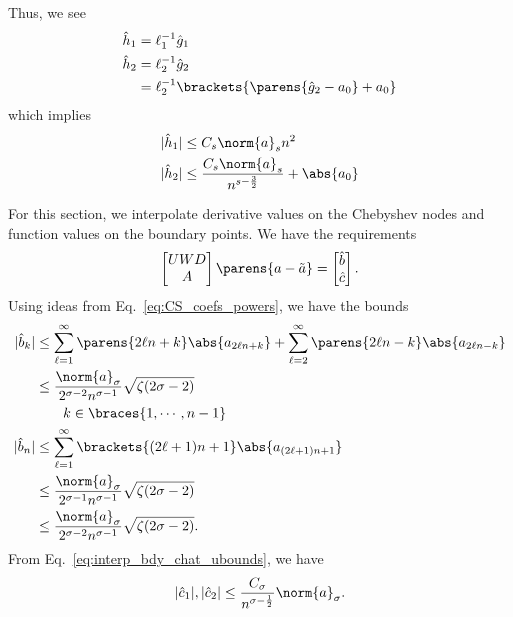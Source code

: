 Thus, we see
%
\begin{align}
    \hat{h}_{1} &= \ell_{1}^{-1}\hat{g}_{1} \nonumber\\
    \hat{h}_{2} &= \ell_{2}^{-1}\hat{g}_{2} \nonumber\\
        &= \ell_{2}^{-1}\brackets{\parens{\hat{g}_{2} - a_{0}} + a_{0}}
\end{align}
%
which implies
%
\begin{align}
    |\hat{h}_{1}| &\le C_{s}\norm{a}_{s}n^{2} \nonumber\\
    |\hat{h}_{2}| &\le \frac{C_{s}\norm{a}_{s}}{n^{s-\frac{3}{2}}}
        + \abs{a_{0}} \nonumber\\
\end{align} 

\clearpage

For this section, we interpolate derivative values on the Chebyshev
nodes and function values on the boundary points.
We have the requirements
%
\begin{equation}
    \begin{bmatrix}UWD\\A\end{bmatrix} \parens{a-\tilde{a}} =
        \begin{bmatrix}\hat{b}\\\hat{c}\end{bmatrix}.
\end{equation}
%
Using ideas from Eq.~\eqref{eq:CS_coefs_powers}, we have the bounds
%
\begin{align}
    |\hat{b}_{k}| &\le \sum_{\ell=1}^{\infty}\parens{2\ell n +k}
        \abs{a_{2\ell n+k}} + \sum_{\ell=2}^{\infty}\parens{2\ell n-k}
        \abs{a_{2\ell n-k}} \nonumber\\
    &\le \frac{\norm{a}_{\sigma}}{2^{\sigma-2}n^{\sigma-1}}\sqrt{
        \zeta(2\sigma-2)} \nonumber\\
            &\qquad k\in\braces{1,\cdots,n-1} \nonumber\\
    |\hat{b}_{n}| &\le \sum_{\ell=1}^{\infty} \brackets{(2\ell+1)n+1}
        \abs{a_{(2\ell+1)n+1}} \nonumber\\
    &\le \frac{\norm{a}_{\sigma}}{2^{\sigma-1}n^{\sigma-1}}
        \sqrt{\zeta(2\sigma-2)}
        \nonumber\\
    &\le \frac{\norm{a}_{\sigma}}{2^{\sigma-2}n^{\sigma-1}}
        \sqrt{\zeta(2\sigma-2)}.
    \label{eq:birkhoff_bdy_bhat_def}
\end{align}
%
From Eq.~\eqref{eq:interp_bdy_chat_ubounds}, we have
%
\begin{equation}
    |\hat{c}_{1}|, |\hat{c}_{2}| \le
        \frac{C_{\sigma}}{n^{\sigma-\frac{1}{2}}}\norm{a}_{\sigma}.
\end{equation}

